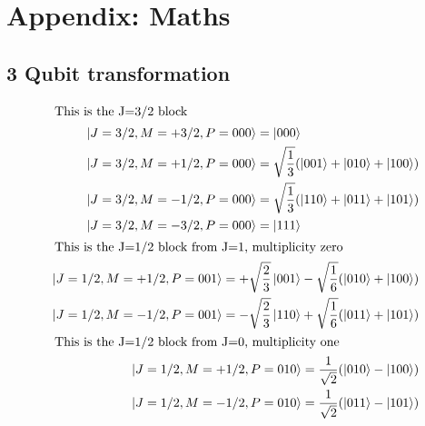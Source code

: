 \appendix
\section{Appendix: Maths}

\subsection{3 Qubit transformation}

\begin{subequations}
\begin{align}
\intertext{ This is the J=3/2 block}
\begin{split}
&\left\vert{J=3/2, M=+3/2, P=000}\right\rangle = \left\vert{000}\right\rangle \\
&\left\vert{J=3/2, M=+1/2, P=000}\right\rangle = \sqrt{\frac{1}{3}}(\left\vert{001}\right\rangle+\left\vert{010}\right\rangle+\left\vert{100}\right\rangle) \\
&\left\vert{J=3/2, M=-1/2, P=000}\right\rangle = \sqrt{\frac{1}{3}}(\left\vert{110}\right\rangle+\left\vert{011}\right\rangle+\left\vert{101}\right\rangle) \\
&\left\vert{J=3/2, M=-3/2, P=000}\right\rangle = \left\vert{111}\right\rangle \\ 
\end{split} \\
\intertext{ This is the J=1/2 block from J=1, multiplicity zero}
\begin{split}
&\left\vert{J=1/2, M=+1/2, P=001}\right\rangle =+\sqrt{\frac{2}{3}}\left\vert{001}\right\rangle - \sqrt{\frac{1}{6}}(\left\vert{010}\right\rangle+\left\vert{100}\right\rangle) \\
&\left\vert{J=1/2, M=-1/2, P=001}\right\rangle =-\sqrt{\frac{2}{3}}\left\vert{110}\right\rangle + \sqrt{\frac{1}{6}}(\left\vert{011}\right\rangle+\left\vert{101}\right\rangle) \\ 
\end{split} \\
\intertext{ This is the J=1/2 block from J=0, multiplicity one}
\begin{split}
&\left\vert{J=1/2, M=+1/2, P=010}\right\rangle = \frac{1}{\sqrt{2}} (\left\vert{010}\right\rangle-\left\vert{100}\right\rangle)\\
&\left\vert{J=1/2, M=-1/2, P=010}\right\rangle = \frac{1}{\sqrt{2}} (\left\vert{011}\right\rangle-\left\vert{101}\right\rangle)\\
\end{split} 
\label{eq:3cgcoeff}
\end{align}
\end{subequations}

